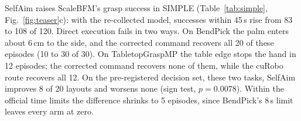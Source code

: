 \documentclass[conference]{IEEEtran}
\begin{document}
SelfAim raises ScaleBFM's grasp success in SIMPLE (Table~\ref{tab:simple}, Fig.~\ref{fig:teaser}c): with the re-collected model, successes within 45\,s rise from 83 to 108 of 120. Direct execution fails in two ways. On BendPick the palm enters about 6\,cm to the side, and the corrected command recovers all 20 of these episodes (10 to 30 of 30). On TabletopGraspMP the table edge stops the hand in 12 episodes; the corrected command recovers none of them, while the cuRobo route recovers all 12. On the pre-registered decision set, these two tasks, SelfAim improves 8 of 20 layouts and worsens none (sign test, $p=0.0078$). Within the official time limits the difference shrinks to 5 episodes, since BendPick's 8\,s limit leaves every arm at zero.


\end{document}
